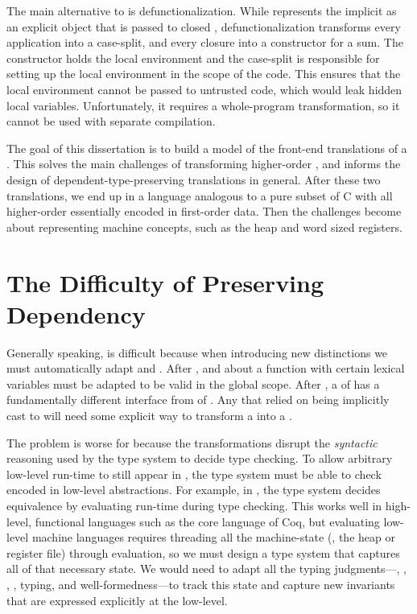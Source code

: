 The main alternative to  is defunctionalization.
While  represents the implicit  as an
explicit object that is passed to closed , defunctionalization
transforms every application into a case-split, and every closure into a
constructor for a sum.
The constructor holds the local environment and the case-split is responsible
for setting up the local environment in the scope of the code.
This ensures that the local environment cannot be passed to untrusted code,
which would leak hidden local variables.
Unfortunately, it requires a whole-program transformation, so it cannot be used
with separate compilation.

The goal of this dissertation is to build a model of the front-end translations
of a .
This solves the main challenges of transforming higher-order  , and informs the design of dependent-type-preserving
translations in general.
After these two translations, we end up in a language analogous to a pure subset
of C with all higher-order  essentially encoded in first-order
data.
Then the challenges become about representing  machine
concepts, such as the heap and word sized registers.

\section{The Difficulty of Preserving Dependency}
Generally speaking,  is difficult because when introducing
new distinctions we must automatically adapt  and
.
After ,  and  about a
function with certain lexical variables must be adapted to be valid in the
global scope.
After , a  of   has a fundamentally
different interface from  of  .
Any  that relied on  being implicitly cast
to  will need some explicit way to transform a 
into a .

The problem is worse for   because the
 transformations disrupt the \emph{syntactic} reasoning used by
the type system to decide type checking.
To allow arbitrary low-level run-time  to still appear in
, the type system must be able to check  encoded in
low-level abstractions.
For example, in \slang, the type system decides equivalence by evaluating
run-time  during type checking.
This works well in high-level, functional languages such as the core language of
Coq, but evaluating low-level machine languages requires threading all the
machine-state (\eg, the heap or register file) through evaluation, so we must
design a type system that captures all of that necessary state.
We would need to adapt all the typing judgments---,
, , , typing, and
well-formedness---to track this state and capture new invariants that are
expressed explicitly at the low-level.


